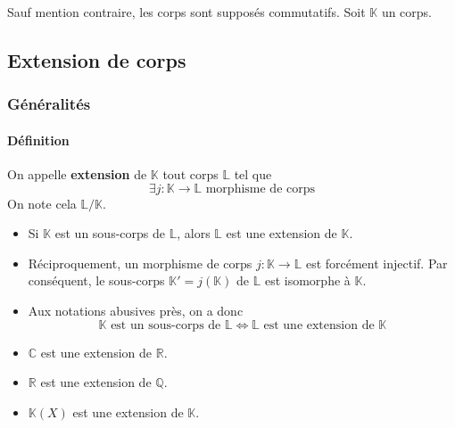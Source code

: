 



	
	Sauf mention contraire, les corps sont supposés commutatifs. Soit $\mathbb{K}$ un corps.
	
	\subsection{Extension de corps}
	
	\subsubsection{Généralités}
	
	\paragraph{Définition}
	
	
	\begin{definition}
		On appelle \textbf{extension} de $\mathbb{K}$ tout corps $\mathbb{L}$ tel que
		\[ \exists j : \mathbb{K} \rightarrow \mathbb{L} \text{ morphisme de corps} \]
		On note cela $\mathbb{L}/\mathbb{K}$.
	\end{definition}
	
	\begin{remark}
		\begin{itemize}
			\item Si $\mathbb{K}$ est un sous-corps de $\mathbb{L}$, alors $\mathbb{L}$ est une extension de $\mathbb{K}$.
			\item Réciproquement, un morphisme de corps $j : \mathbb{K} \rightarrow \mathbb{L}$ est forcément injectif. Par conséquent, le sous-corps $\mathbb{K}' = j(\mathbb{K})$ de $\mathbb{L}$ est isomorphe à $\mathbb{K}$.
			\item Aux notations abusives près, on a donc
			\[ \mathbb{K} \text{ est un sous-corps de } \mathbb{L} \iff \mathbb{L} \text{ est une extension de } \mathbb{K} \]
		\end{itemize}
	\end{remark}
	
	\begin{example}
		\begin{itemize}
			\item $\mathbb{C}$ est une extension de $\mathbb{R}$.
			\item $\mathbb{R}$ est une extension de $\mathbb{Q}$.
			\item $\mathbb{K}(X)$ est une extension de $\mathbb{K}$.
		\end{itemize}
	\end{example}
	
